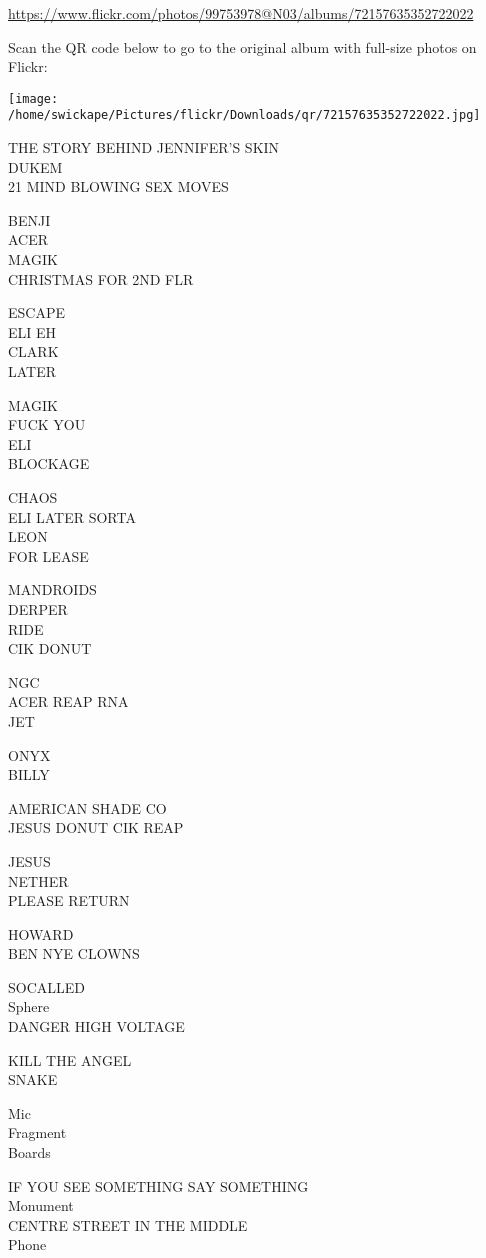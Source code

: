 \documentclass[10pt,letterpaper]{article}
\begin{document}
\url{https://www.flickr.com/photos/99753978@N03/albums/72157635352722022}

Scan the QR code below to go to the original album with full-size photos on Flickr:

\texttt{[image: /home/swickape/Pictures/flickr/Downloads/qr/72157635352722022.jpg]}


THE STORY BEHIND JENNIFER'S SKIN\\
DUKEM\\
21 MIND BLOWING SEX MOVES

BENJI\\
ACER\\
MAGIK\\
CHRISTMAS FOR 2ND FLR

ESCAPE\\
ELI EH\\
CLARK\\
LATER

MAGIK\\
FUCK YOU\\
ELI\\
BLOCKAGE

CHAOS\\
ELI LATER SORTA\\
LEON\\
FOR LEASE

MANDROIDS\\
DERPER\\
RIDE\\
CIK DONUT

NGC\\
ACER REAP RNA\\
JET

ONYX\\
BILLY

AMERICAN SHADE CO\\
JESUS DONUT CIK REAP

JESUS\\
NETHER\\
PLEASE RETURN

HOWARD\\
BEN NYE CLOWNS

SOCALLED\\
Sphere\\
DANGER HIGH VOLTAGE

KILL THE ANGEL\\
SNAKE

Mic\\
Fragment\\
Boards

IF YOU SEE SOMETHING SAY SOMETHING\\
Monument\\
CENTRE STREET IN THE MIDDLE\\
Phone
\end{document}
